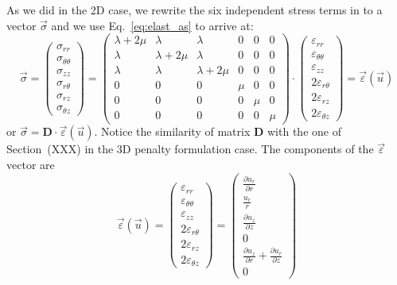 As we did in the 2D case, we rewrite the six independent stress terms in to a vector $\vec\sigma$ and we use Eq.~\eqref{eq:elast_as} to arrive at:
\[
\vec{\sigma}=
\left(
\begin{array}{c}
\sigma_{rr} \\
\sigma_{\theta\theta} \\
\sigma_{zz} \\
\sigma_{r\theta} \\
\sigma_{rz} \\
\sigma_{\theta z} 
\end{array}
\right)
=
\left(
\begin{array}{cccccc}
\lambda+2\mu & \lambda & \lambda & 0 & 0 & 0 \\
\lambda & \lambda+2\mu & \lambda & 0 & 0 & 0 \\
\lambda & \lambda & \lambda+2\mu & 0 & 0 & 0 \\
0 & 0 & 0 & \mu & 0 & 0\\
0 & 0 & 0 & 0 & \mu & 0\\
0 & 0 & 0 & 0 & 0 & \mu
\end{array}
\right)
\cdot
\left(
\begin{array}{c}
\varepsilon_{rr} \\
\varepsilon_{\theta\theta} \\
\varepsilon_{zz} \\
2\varepsilon_{r\theta} \\
2\varepsilon_{rz} \\
2\varepsilon_{\theta z} 
\end{array}
\right)
=\vec\varepsilon(\vec u)
\]
or $\vec\sigma = {\bm D} \cdot \vec\varepsilon(\vec u)$. Notice the similarity of matrix ${\bm D}$ with the one of Section~(XXX) in the 3D penalty formulation case.
The components of the $\vec\varepsilon$ vector are
\[
\vec\varepsilon(\vec u)
=
\left(
\begin{array}{c}
\varepsilon_{rr} \\
\varepsilon_{\theta\theta} \\
\varepsilon_{zz} \\
2\varepsilon_{r\theta} \\
2\varepsilon_{rz} \\
2\varepsilon_{\theta z} 
\end{array}
\right)
=
\left(
\begin{array}{c}
\frac{\partial u_r}{\partial r} \\ 
\frac{u_r}{r} \\ 
\frac{\partial u_z}{\partial z} \\ 
0 \\ 
\frac{\partial u_z}{\partial r}+\frac{\partial u_r}{\partial z} \\ 
0
\end{array}
\right)
\]
